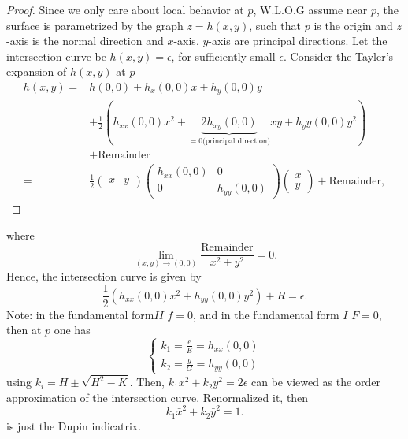 \begin{proof}
    Since we only care about local behavior at \(p\), W.L.O.G assume
     near \(p\), the surface is parametrized by the graph \(z=h(x,y)\),
     such that \(p\) is the origin and \(z\)-axis is the normal direction 
      and \(x\)-axis, \(y\)-axis are principal directions.
      Let the intersection curve be \(h(x,y)=\epsilon\), for sufficiently
      small \(\epsilon\). Consider the Tayler's expansion of 
      \(h(x,y)\) at \(p\)
      \begin{align*}
        h(x,y)=&h(0,0)+h_x(0,0)x+h_y(0,0)y\\
        &+\frac{1}{2}\left(
            h_{xx}(0,0)x^2+\underbrace{2h_{xy}(0,0)}_{
                =0\text{(principal direction)}
            }xy+h_yy(0,0)y^2
        \right)\\
        &+\text{Remainder}\\
        =&\frac{1}{2}\begin{pmatrix}
            x&y
        \end{pmatrix}
        \begin{pmatrix}
            h_{xx}(0,0)&0\\
            0&h_{yy}(0,0)
        \end{pmatrix}
        \begin{pmatrix}
            x\\
            y
        \end{pmatrix}+\text{Remainder},
      \end{align*}
\end{proof}
where 
\[
    \lim_{(x,y)\to (0,0)}    \frac{\text{Remainder}}{x^2+y^2}=0.
\]
Hence, the intersection curve is given by 
\[
    \frac{1}{2}\left(h_{xx}(0,0)x^2+h_{yy}(0,0)y^2\right)+R=\epsilon.    
\]
Note: in the  fundamental form\(II\) \(f=0\), 
and in the   fundamental form \(I\) \(F=0\),
then at \(p\) one has 
\[
    \begin{cases}
        k_1=\frac{e}{E}=h_{xx}(0,0)\\
        k_2=\frac{g}{G}=h_{yy}(0,0)
    \end{cases}    
\]
using \(k_i=H\pm\sqrt{H^2-K}\). Then, \(k_1x^2+k_2y^2=2\epsilon\)
can be viewed as the  order approximation of the 
intersection curve. Renormalized it, then 
\[k_1 \bar{x}^2+k_2\bar{y}^2=1.\]
is just the Dupin indicatrix.
